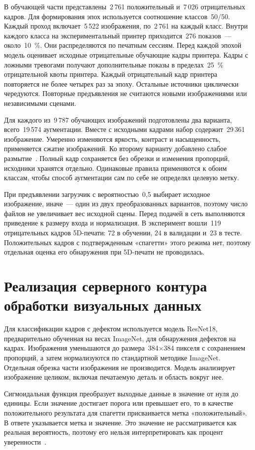 В обучающей части представлены~2\,761 положительный и~7\,026 отрицательных кадров. Для формирования эпох используется соотношение классов~50/50. Каждый проход включает~5\,522 изображения, по~2\,761 на каждый класс. Внутри каждого класса на экспериментальный принтер приходится~276 показов~--- около~10~\%. Они распределяются по печатным сессиям. Перед каждой эпохой модель оценивает исходные отрицательные обучающие кадры принтера. Кадры с ложными тревогами получают дополнительные показы в пределах~25~\% отрицательной квоты принтера. Каждый отрицательный кадр принтера повторяется не более четырех раз за эпоху. Остальные источники циклически чередуются. Повторные предъявления не считаются новыми изображениями или независимыми сценами.

Для каждого из~9\,787 обучающих изображений подготовлены два варианта, всего~19\,574 аугментации. Вместе с исходными кадрами набор содержит~29\,361 изображение. Умеренно изменяются яркость, контраст и насыщенность, применяется сжатие изображений. Ко второму варианту добавлено слабое размытие~\cite{shorten2019survey}. Полный кадр сохраняется без обрезки и изменения пропорций, исходники хранятся отдельно. Одинаковые правила применяются к обоим классам, чтобы способ аугментации сам по себе не определял целевую метку.

При предъявлении загрузчик с вероятностью~0,5 выбирает исходное изображение, иначе~--- один из двух преобразованных вариантов, поэтому число файлов не увеличивает вес исходной сцены. Перед подачей в сеть выполняются приведение к размеру входа и нормализация. В эксперимент вошли~119 отрицательных кадров 5D-печати: 72 в обучении, 24 в валидации и~23 в тесте. Положительных кадров с подтвержденным «спагетти» этого режима нет, поэтому отдельная оценка его обнаружения при 5D-печати не проводилась.

\section{Реализация серверного контура обработки визуальных данных}
Для классификации кадров с дефектом используется модель ResNet18, предварительно обученная на весах ImageNet, для обнаружения дефектов на кадрах. Изображения уменьшаются до размера~384\(\times\)384 пикселя с сохранением пропорций, а затем нормализуются по стандартной методике ImageNet. Отдельная обрезка части изображения не производится. Модель анализирует изображение целиком, включая печатаемую деталь и область вокруг нее.

Сигмоидальная функция преобразует выходные данные в значение от нуля до единицы. Если значение достигает порога или превышает его, то в качестве положительного результата для спагетти присваивается метка «положительный». В ответе указывается метка и значение. Это значение не рассматривается как реальная вероятность, поэтому его нельзя интерпретировать как процент уверенности~\cite{guo2017calibration}.

